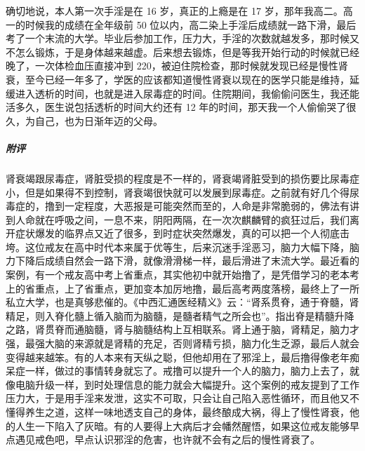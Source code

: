 \begin{case}
    确切地说，本人第一次手淫是在 16 岁，真正的上瘾是在 17 岁，那年我高二。高一的时候我的成绩在全年级前 50 位以内，高二染上手淫后成绩就一路下滑，最后考了一个末流的大学。毕业后参加工作，压力大，手淫的次数就越发多，那时候又不怎么锻炼，于是身体越来越虚。后来想去锻炼，但是等我开始行动的时候就已经晚了，一次体检血压直接冲到 220，被迫住院检查，那时候就发现已经是慢性肾衰，至今已经一年多了，学医的应该都知道慢性肾衰以现在的医学只能是维持，延缓进入透析的时间，也就是进入尿毒症的时间。住院期间，我偷偷问医生，我还能活多久，医生说包括透析的时间大约还有 12 年的时间，那天我一个人偷偷哭了很久，为自己，也为日渐年迈的父母。
    \subparagraph{附评} 肾衰竭跟尿毒症，肾脏受损的程度是不一样的，肾衰竭肾脏受到的损伤要比尿毒症小，但是如果得不到控制，肾衰竭很快就可以发展到尿毒症。之前就有好几个得尿毒症的，撸到一定程度，大恶报是可能突然而至的，人命是非常脆弱的，佛法有讲到人命就在呼吸之间，一息不来，阴阳两隔，在一次次麒麟臂的疯狂过后，我们离开症状爆发的临界点又近了很多，到时症状突然爆发，真的可以把一个人彻底击垮。这位戒友在高中时代本来属于优等生，后来沉迷手淫恶习，脑力大幅下降，脑力下降后成绩自然会一路下滑，就像滑滑梯一样，最后滑进了末流大学。最近看的案例，有一个戒友高中考上省重点，其实他初中就开始撸了，是凭借学习的老本考上的省重点，上了省重点，更加变本加厉地撸，最后高考两度落榜，最终上了一所私立大学，也是真够悲催的。《中西汇通医经精义》云：“肾系贯脊，通于脊髓，肾精足，则入脊化髓上循入脑而为脑髓，是髓者精气之所会也”。指出脊是精髓升降之路，肾贯脊而通脑髓，肾与脑髓结构上互相联系。肾上通于脑，肾精足，脑力才强，最强大脑的来源就是肾精的充足，否则肾精亏损，脑力化生乏源，最后人就会变得越来越笨。有的人本来有天纵之聪，但他却用在了邪淫上，最后撸得像老年痴呆症一样，做过的事情转身就忘了。戒撸可以提升一个人的脑力，脑力上去了，就像电脑升级一样，到时处理信息的能力就会大幅提升。这个案例的戒友提到了工作压力大，于是用手淫来发泄，这实不可取，只会让自己陷入恶性循环，而且他又不懂得养生之道，这样一味地透支自己的身体，最终酿成大祸，得上了慢性肾衰，他的人生一下陷入了灰暗。有的人要得上大病后才会幡然醒悟，如果这位戒友能够早点遇见戒色吧，早点认识邪淫的危害，也许就不会有之后的慢性肾衰了。
\end{case}

